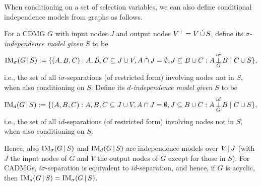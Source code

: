 When conditioning on a set of selection variables, we can also define conditional independence models from graphs as follows.
\begin{Def}\label{def:conditional_independence_model_graph}
  For a CDMG $G$ with input nodes $J$ and output nodes $V^+ = V \,\dot{\cup}\, S$, define its \emph{$\sigma$-independence model given $S$} to be
  $$\mathrm{IM}_\sigma(G \operatorname*{|} S) := \{ \left ( A, B, C \right ) : A, B, C \subseteq J \cup V, A \cap J = \emptyset, J \subseteq B \cup C : A \operatorname*{\perp}^{i\sigma}_G B \mid C \cup S \},$$
  i.e., the set of all $i\sigma$-separations (of restricted form) involving nodes not in $S$, when also conditioning on $S$. 
  Define its \emph{$d$-independence model given $S$} to be
  $$\mathrm{IM}_d(G \operatorname*{|} S) := \{ \left ( A, B, C \right ) : A, B, C \subseteq J \cup V, A \cap J = \emptyset, J \subseteq B \cup C : A \operatorname*{\perp}^{id}_G B \mid C \cup S \},$$
  i.e., the set of all $id$-separations (of restricted form) involving nodes not in $S$, when also conditioning on $S$.
\end{Def}
Hence, also $\mathrm{IM}_\sigma(G \operatorname*{|} S)$ and $\mathrm{IM}_d(G \operatorname*{|} S)$ are independence models over $V \operatorname*{|} J$ (with $J$ the input nodes of $G$ and $V$ the output nodes of $G$ except for those in $S$).
For CADMGs, $i\sigma$-separation is equivalent to $id$-separation, and hence, if $G$ is acyclic, then $\mathrm{IM}_d(G \operatorname*{|} S) = \mathrm{IM}_\sigma(G \operatorname*{|} S)$.


